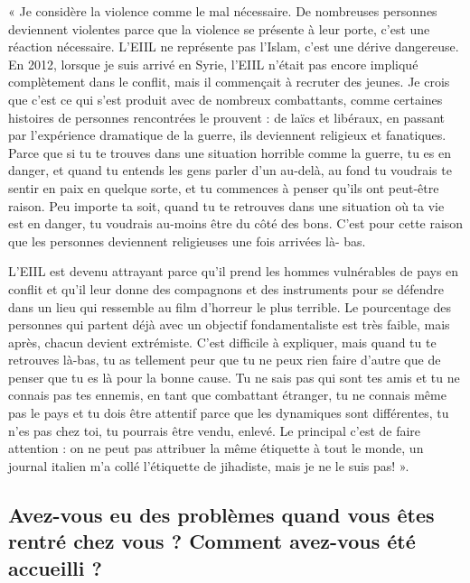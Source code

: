 « Je considère la violence comme le mal nécessaire. De nombreuses
personnes deviennent violentes parce que la violence se présente à leur
porte, c'est une réaction nécessaire. L'EIIL ne représente pas l'Islam,
c'est une dérive dangereuse. En 2012, lorsque je suis arrivé en Syrie,
l'EIIL n'était pas encore impliqué complètement dans le conflit, mais il
commençait à recruter des jeunes. Je crois que c'est ce qui s'est
produit avec de nombreux combattants, comme certaines histoires de
personnes rencontrées le prouvent : de laïcs et libéraux, en passant par
l'expérience dramatique de la guerre, ils deviennent religieux et
fanatiques. Parce que si tu te trouves dans une situation horrible comme
la guerre, tu es en danger, et quand tu entends les gens parler d'un
au-delà, au fond tu voudrais te sentir en paix en quelque sorte, et tu
commences à penser qu'ils ont peut-être raison. Peu importe ta soit,
quand tu te retrouves dans une situation où ta vie est en danger, tu
voudrais au-moins être du côté des bons. C'est pour cette raison que les
personnes deviennent religieuses une fois arrivées là- bas.

L'EIIL est devenu attrayant parce qu'il prend les hommes vulnérables de
pays en conflit et qu'il leur donne des compagnons et des instruments
pour se défendre dans un lieu qui ressemble au film d'horreur le plus
terrible. Le pourcentage des personnes qui partent déjà avec un objectif
fondamentaliste est très faible, mais après, chacun devient extrémiste.
C'est difficile à expliquer, mais quand tu te retrouves là-bas, tu as
tellement peur que tu ne peux rien faire d'autre que de penser que tu es
là pour la bonne cause. Tu ne sais pas qui sont tes amis et tu ne
connais pas tes ennemis, en tant que combattant étranger, tu ne connais
même pas le pays et tu dois être attentif parce que les dynamiques sont
différentes, tu n'es pas chez toi, tu pourrais être vendu, enlevé. Le
principal c'est de faire attention : on ne peut pas attribuer la même
étiquette à tout le monde, un journal italien m'a collé l'étiquette de
jihadiste, mais je ne le suis pas! ».

\hypertarget{avez-vous-eu-des-probluxe8mes-quand-vous-uxeates-rentruxe9-chez-vous-comment-avez-vous-uxe9tuxe9-accueilli}{%
\subsection{Avez-vous eu des problèmes quand vous êtes rentré chez vous ?
Comment avez-vous été accueilli
?}\label{avez-vous-eu-des-probluxe8mes-quand-vous-uxeates-rentruxe9-chez-vous-comment-avez-vous-uxe9tuxe9-accueilli}}

